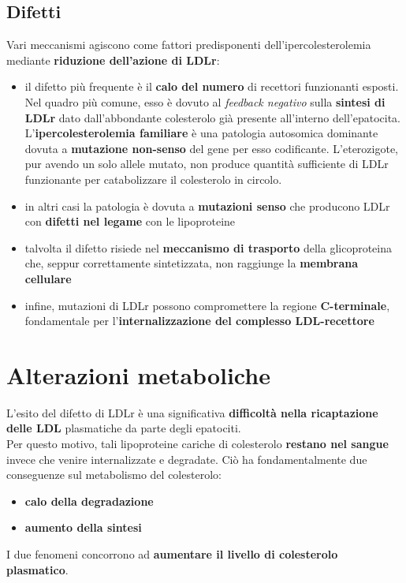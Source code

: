 \documentclass[a4paper, 12pt]{article}
\begin{document}
\begin{titlepage}
\subsection{Difetti}
Vari meccanismi agiscono come fattori predisponenti dell'ipercolesterolemia mediante \textbf{riduzione dell'azione di LDLr}:
\begin{itemize}
\item il difetto più frequente è il \textbf{calo del numero} di recettori funzionanti esposti. Nel quadro più comune, esso è dovuto al \textit{feedback negativo} sulla \textbf{sintesi di LDLr} dato dall'abbondante colesterolo già presente all'interno dell'epatocita.\\ L'\textbf{ipercolesterolemia familiare} è una patologia autosomica dominante dovuta a \textbf{mutazione non-senso} del gene per esso codificante. L'eterozigote, pur avendo un solo allele mutato, non produce quantità sufficiente di LDLr funzionante per catabolizzare il colesterolo in circolo.
\item in altri casi la patologia è dovuta a \textbf{mutazioni senso} che producono LDLr con \textbf{difetti nel legame} con le lipoproteine
\item talvolta il difetto risiede nel \textbf{meccanismo di trasporto} della glicoproteina che, seppur correttamente sintetizzata, non raggiunge la \textbf{membrana cellulare}
\item infine, mutazioni di LDLr possono compromettere la regione \textbf{C-terminale}, fondamentale per l'\textbf{internalizzazione del complesso LDL-recettore}
\end{itemize}

\section{Alterazioni metaboliche}
L'esito del difetto di LDLr è una significativa \textbf{difficoltà nella ricaptazione delle LDL} plasmatiche da parte degli epatociti.\\
Per questo motivo, tali lipoproteine cariche di colesterolo \textbf{restano nel sangue} invece che venire internalizzate e degradate. Ciò ha fondamentalmente due conseguenze sul metabolismo del colesterolo:
\begin{itemize}
\item \textbf{calo della degradazione}
\item \textbf{aumento della sintesi}
\end{itemize}
I due fenomeni concorrono ad \textbf{aumentare il livello di colesterolo plasmatico}.


\end{titlepage}
\end{document}
